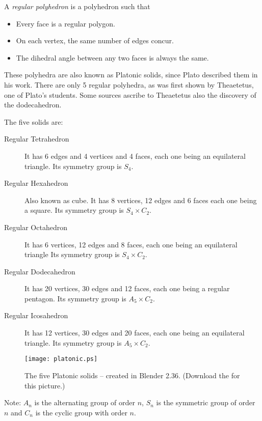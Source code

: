 \documentclass{article}
\begin{document}
A \emph{regular polyhedron} is a polyhedron such that
\begin{itemize}
\item Every face is a regular polygon.
\item On each vertex, the same number of edges concur.
\item The dihedral angle between any two faces is always the same.
\end{itemize}

These polyhedra are also known as Platonic solids, since Plato described them in his work. There are only 5 regular polyhedra, as was first shown by Theaetetus, one of Plato's students. Some sources ascribe to Theaetetus also the discovery of the dodecahedron. 

The five solids are:
\begin{description}
\item[Regular Tetrahedron] It has 6 edges and 4 vertices and 4 faces, each one being an equilateral triangle. Its symmetry group is $S_4$.
\item[Regular Hexahedron] Also known as cube. It has 8 vertices, 12 edges and 6 faces each one being a square. Its symmetry group is $S_4\times C_2$.
\item[Regular Octahedron] It has 6 vertices, 12 edges and 8 faces, each one being an equilateral triangle Its symmetry group is $S_4\times C_2$.
\item[Regular Dodecahedron] It has 20 vertices, 30 edges and 12 faces, each one being a regular pentagon. Its symmetry group is $A_5\times C_2$.
\item[Regular Icosahedron] It has 12 vertices, 30 edges and 20 faces, each one being an equilateral triangle. Its symmetry group is $A_5\times C_2$.
\end{description}
\begin{figure}[h]
\begin{centering}
\texttt{[image: platonic.ps]}
\caption{The five Platonic solids -- created in Blender 2.36. (Download the  for this picture.)}
\end{centering}
\end{figure}

\small Note: $A_n$ is the alternating group of order $n$, $S_n$ is the symmetric group of order $n$ and $C_n$ is the cyclic group with order $n$.
\end{document}
